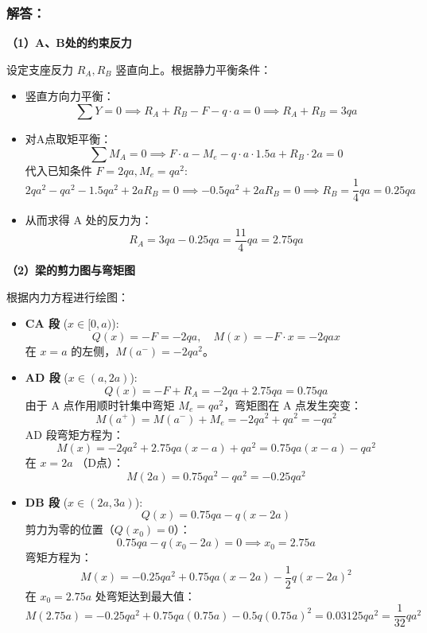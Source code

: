 \documentclass[11pt,a4paper]{ctexrep}
\begin{document}
{\subsubsection*{解答：}

\textbf{（1）A、B处的约束反力}

设定支座反力 $R_A, R_B$ 竖直向上。根据静力平衡条件：
\begin{itemize}
    \item 竖直方向力平衡：
    \[
        \sum Y = 0 \implies R_A + R_B - F - q \cdot a = 0 \implies R_A + R_B = 3qa
    \]
    \item 对A点取矩平衡：
    \[
        \sum M_A = 0 \implies F \cdot a - M_e - q \cdot a \cdot 1.5a + R_B \cdot 2a = 0
    \]
    代入已知条件 $F = 2qa, M_e = qa^2$:
    \[
        2qa^2 - qa^2 - 1.5qa^2 + 2a R_B = 0 \implies -0.5qa^2 + 2a R_B = 0 \implies R_B = \frac{1}{4}qa = 0.25qa
    \]
    \item 从而求得 A 处的反力为：
    \[
        R_A = 3qa - 0.25qa = \frac{11}{4}qa = 2.75qa
    \]
\end{itemize}

\textbf{（2）梁的剪力图与弯矩图}

根据内力方程进行绘图：
\begin{itemize}
    \item \textbf{CA 段} ($x \in [0, a)$):
    \[
        Q(x) = -F = -2qa, \quad M(x) = -F \cdot x = -2qa x
    \]
    在 $x=a$ 的左侧，$M(a^-) = -2qa^2$。
    \item \textbf{AD 段} ($x \in (a, 2a)$):
    \[
        Q(x) = -F + R_A = -2qa + 2.75qa = 0.75qa
    \]
    由于 A 点作用顺时针集中弯矩 $M_e = qa^2$，弯矩图在 A 点发生突变：
    \[
        M(a^+) = M(a^-) + M_e = -2qa^2 + qa^2 = -qa^2
    \]
    AD 段弯矩方程为：
    \[
        M(x) = -2qa^2 + 2.75qa(x-a) + qa^2 = 0.75qa(x-a) - qa^2
    \]
    在 $x=2a$ （D点）：
    \[
        M(2a) = 0.75qa^2 - qa^2 = -0.25qa^2
    \]
    \item \textbf{DB 段} ($x \in (2a, 3a)$):
    \[
        Q(x) = 0.75qa - q(x-2a)
    \]
    剪力为零的位置（$Q(x_0) = 0$）：
    \[
        0.75qa - q(x_0-2a) = 0 \implies x_0 = 2.75a
    \]
    弯矩方程为：
    \[
        M(x) = -0.25qa^2 + 0.75qa(x-2a) - \frac{1}{2}q(x-2a)^2
    \]
    在 $x_0 = 2.75a$ 处弯矩达到最大值：
    \[
        M(2.75a) = -0.25qa^2 + 0.75qa(0.75a) - 0.5q(0.75a)^2 = 0.03125 qa^2 = \frac{1}{32}qa^2
    \]
\end{itemize}

\begin{center}
\end{center}

}
\end{document}
